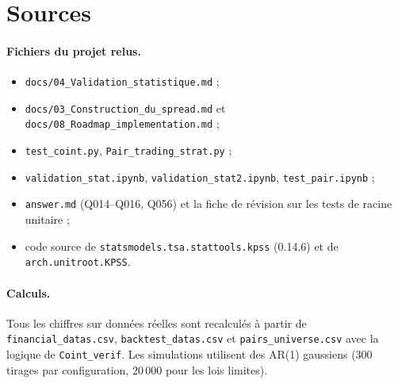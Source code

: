 \documentclass[11pt,a4paper]{article}
\newcommand{\code}[1]{\texttt{#1}}
\theoremstyle{definition}
\begin{document}
\section*{Sources}

\paragraph{Fichiers du projet relus.}
\begin{itemize}
\item \code{docs/04\_Validation\_statistique.md} ;
\item \code{docs/03\_Construction\_du\_spread.md} et \code{docs/08\_Roadmap\_implementation.md} ;
\item \code{test\_coint.py}, \code{Pair\_trading\_strat.py} ;
\item \code{validation\_stat.ipynb}, \code{validation\_stat2.ipynb}, \code{test\_pair.ipynb} ;
\item \code{answer.md} (Q014--Q016, Q056) et la fiche de révision sur les tests de racine unitaire ;
\item code source de \code{statsmodels.tsa.stattools.kpss} (0.14.6) et de \code{arch.unitroot.KPSS}.
\end{itemize}

\paragraph{Calculs.} Tous les chiffres sur données réelles sont recalculés à partir de \code{financial\_datas.csv}, \code{backtest\_datas.csv} et \code{pairs\_universe.csv} avec la logique de \code{Coint\_verif}. Les simulations utilisent des AR(1) gaussiens ($300$ tirages par configuration, $20\,000$ pour les lois limites).
\end{document}
